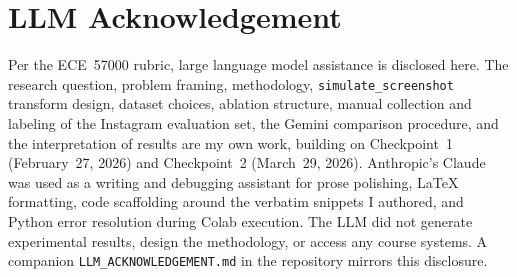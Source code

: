 \documentclass{article}
\begin{document}
\section*{LLM Acknowledgement}
\label{sec:llm}

Per the ECE~57000 rubric, large language model assistance is
disclosed here. The research question, problem framing, methodology,
\texttt{simulate\_screenshot} transform design, dataset choices,
ablation structure, manual collection and labeling of the Instagram
evaluation set, the Gemini comparison procedure, and the
interpretation of results are my own work, building on Checkpoint~1
(February~27, 2026) and Checkpoint~2 (March~29, 2026). Anthropic's
Claude was used as a writing and debugging assistant for prose
polishing, LaTeX formatting, code scaffolding around the verbatim
snippets I authored, and Python error resolution during Colab
execution. The LLM did not generate experimental results, design
the methodology, or access any course systems. A companion
\texttt{LLM\_ACKNOWLEDGEMENT.md} in the repository mirrors this
disclosure.



\end{document}
